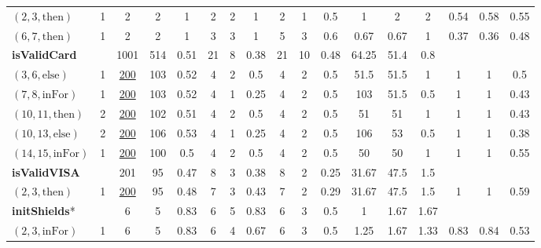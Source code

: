 \documentclass[sigconf]{acmart}
\newcommand{\thenBr}{\text{then}}
\newcommand{\elseBr}{\text{else}}
\newcommand{\inFor}{\text{inFor}}
\newcommand{\un}[1]{\underline{#1}}
\begin{document}
\begin{table}[!t]
\begin{tabular}{lc|ccc|ccc|ccc|ccc|ccc}
    $(2,3,\thenBr)$   & 1        & 2        & 2    & 1         & 2  & 2 & 1                 & 2 & 1   & 0.5                & 1     & 2     & 2     & 0.54 & 0.58 & 0.55  \\
    $(6,7,\thenBr)$   & 1        & 2        & 2    & 1         & 3  & 3 & 1                 & 5 & 3   & 0.6                & 0.67  & 0.67  & 1     & 0.37 & 0.36 & 0.48  \\
    \toprule
\multicolumn{2}{l|}{\textbf{isValidCard}}        
                                 & 1001     & 514  & 0.51      & 21 & 8 & 0.38              & 21 & 10 & 0.48               & 64.25 & 51.4  & 0.8    &   &   &       \\
    $(3,6,\elseBr)$   & 1        & \un{200} & 103  & 0.52      & 4  & 2 & 0.5               & 4  & 2  & 0.5                & 51.5  & 51.5  & 1      & 1 & 1 & 0.5   \\
    $(7,8,\inFor)$    & 1        & \un{200} & 103  & 0.52      & 4  & 1 & 0.25              & 4  & 2  & 0.5                & 103   & 51.5  & 0.5    & 1 & 1 & 0.43  \\
    $(10,11,\thenBr)$ & 2        & \un{200} & 102  & 0.51      & 4  & 2 & 0.5               & 4  & 2  & 0.5                & 51    & 51    & 1      & 1 & 1 & 0.43  \\
    $(10,13,\elseBr)$ & 2        & \un{200} & 106  & 0.53      & 4  & 1 & 0.25              & 4  & 2  & 0.5                & 106   & 53    & 0.5    & 1 & 1 & 0.38  \\
    $(14,15,\inFor)$  & 1        & \un{200} & 100  & 0.5       & 4  & 2 & 0.5               & 4  & 2  & 0.5                & 50    & 50    & 1      & 1 & 1 & 0.55  \\
    \hline
\multicolumn{2}{l|}{\textbf{isValidVISA}}        
                                 & 201      & 95   & 0.47      & 8  & 3 & 0.38              & 8  & 2  & 0.25               & 31.67 & 47.5  & 1.5    &   &   &       \\
    $(2,3,\thenBr)$   & 1        & \un{200} & 95   & 0.48      & 7  & 3 & 0.43              & 7  & 2  & 0.29               & 31.67 & 47.5  & 1.5    & 1 & 1 & 0.59  \\
    \toprule
\multicolumn{2}{l|}{\textbf{initShields}*}    
                                 & 6        & 5    & 0.83      & 6  & 5 & 0.83              & 6  & 3  & 0.5                & 1      & 1.67 & 1.67   &      &      &       \\
    $(2,3,\inFor)$    & 1        & 6        & 5    & 0.83      & 6  & 4 & 0.67              & 6  & 3  & 0.5                & 1.25   & 1.67 & 1.33   & 0.83 & 0.84 & 0.53  \\

\end{tabular}
\end{table}
\end{document}
